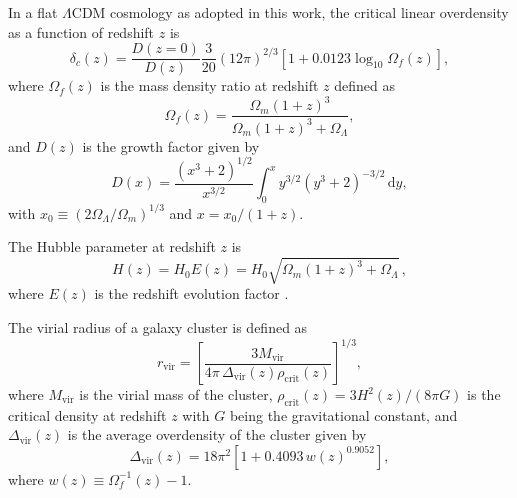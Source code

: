 \documentclass[modern]{aastex62}
\newcommand{\R}[1]{\mathrm{#1}}
\newcommand{\D}[1]{\R{d} #1}
\newcommand{\lcdm}{$\Lambda$CDM}
\begin{document}
In a flat \lcdm{} cosmology as adopted in this work, the critical linear
overdensity as a function of redshift $z$ is \citep{kitayama1996,randall2002}
\begin{equation}
  \label{eq:delta-crit}
  \delta_c(z) = \frac{D(z=0)}{D(z)} \frac{3}{20} (12\pi)^{2/3}
    \left[1 + 0.0123 \log_{10} \Omega_f(z) \right],
\end{equation}
where $\Omega_f(z)$ is the mass density ratio at redshift $z$ defined as
\begin{equation}
  \label{eq:omega-fz}
  \Omega_f(z) = \frac{\Omega_m(1+z)^3}{\Omega_m(1+z)^3 + \Omega_{\Lambda}},
\end{equation}
and $D(z)$ is the growth factor given by \citep[equation~(13.6)]{peebles1980}
\begin{equation}
  \label{eq:growth-factor}
  D(x) = \frac{(x^3 + 2)^{1/2}}{x^{3/2}}
    \int_0^x y^{3/2} (y^3 + 2)^{-3/2} \,\D{y},
\end{equation}
with $x_0 \equiv (2\Omega_{\Lambda}/\Omega_m)^{1/3}$ and $x = x_0 / (1+z)$.

The Hubble parameter at redshift $z$ is
\begin{equation}
  \label{eq:hubble-z}
  H(z) = H_0 E(z) = H_0 \sqrt{\Omega_m(1+z)^3 + \Omega_{\Lambda}} \,,
\end{equation}
where $E(z)$ is the redshift evolution factor \citep{hogg1999}.

The virial radius of a galaxy cluster is defined as
\begin{equation}
  \label{eq:radius-virial}
  r_{\R{vir}} = \left[
    \frac{3 M_{\R{vir}}}{4\pi \,\Delta_{\R{vir}}(z) \rho_{\R{crit}}(z)}
  \right]^{1/3},
\end{equation}
where $M_{\R{vir}}$ is the virial mass of the cluster,
$\rho_{\R{crit}}(z) = 3 H^2(z) / (8\pi G)$ is the critical density
at redshift $z$ with $G$ being the gravitational constant,
and $\Delta_{\R{vir}}(z)$ is the average overdensity of the cluster
given by \citep{kitayama1996,cassano2005}
\begin{equation}
  \label{eq:delta-vir}
  \Delta_{\R{vir}}(z) = 18\pi^2 \left[ 1 + 0.4093 \, w(z)^{0.9052} \right],
\end{equation}
where $w(z) \equiv \Omega_f^{-1}(z) - 1$.





\end{document}
